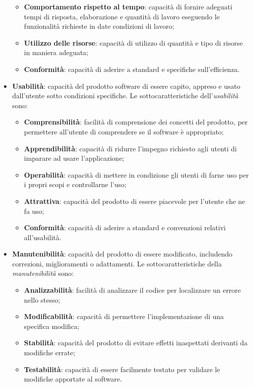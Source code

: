 \begin{itemize}
	\begin{itemize}
	\item \textbf{Comportamento rispetto al tempo}: capacità di fornire adeguati tempi di risposta, elaborazione e quantità di lavoro eseguendo le funzionalità richieste in date condizioni di lavoro;
	\item \textbf{Utilizzo delle risorse}: capacità di utilizzo di quantità e tipo di risorse in maniera adeguata;
	\item \textbf{Conformità}: capacità di aderire a standard e specifiche sull'efficienza.
	\end{itemize}
\item \textbf{Usabilità}: capacità del prodotto software di essere capito, appreso e usato dall'utente sotto condizioni specifiche. Le sottocaratteristiche dell'\textit{usabilità} sono:
	\begin{itemize}
	\item \textbf{Comprensibilità}: facilità di comprensione dei concetti del prodotto, per permettere all'utente di comprendere se il software è appropriato;
	\item \textbf{Apprendibilità}: capacità di ridurre l'impegno richiesto agli utenti di imparare ad usare l'applicazione;
	\item \textbf{Operabilità}: capacità di mettere in condizione gli utenti di farne uso per i propri scopi e controllarne l'uso;
	\item \textbf{Attrattiva}: capacità del prodotto di essere piacevole per l'utente che ne fa uso;
	\item \textbf{Conformità}: capacità di aderire a standard e convenzioni relativi all'usabilità.
	\end{itemize}
\item \textbf{Manutenibilità}: capacità del prodotto di essere modificato, includendo correzioni, miglioramenti o adattamenti. Le sottocaratteristiche della \textit{manutenibilità} sono:
	\begin{itemize}
	\item \textbf{Analizzabilità}: facilità di analizzare il codice per localizzare un errore nello stesso;
	\item \textbf{Modificabilità}: capacità di permettere l'implementazione di una specifica modifica;
	\item \textbf{Stabilità}: capacità del prodotto di evitare effetti inaspettati derivanti da modifiche errate;
	\item \textbf{Testabilità}: capacità di essere facilmente testato per validare le modifiche apportate al software.

\end{itemize}
\end{itemize}
